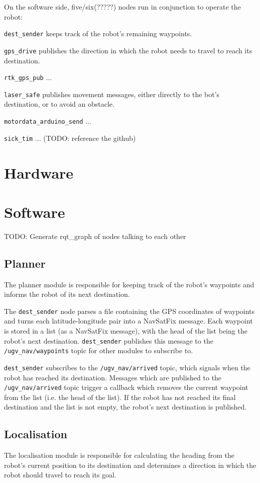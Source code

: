 \documentclass[titlepage,12pt,a4paper]{article}
\begin{document}
On the software side, five/six(?????) nodes run in conjunction to operate the robot:

\verb|dest_sender| keeps track of the robot's remaining waypoints.

\verb|gps_drive| publishes the direction in which the robot needs to travel to reach its destination.

\verb|rtk_gps_pub| ...

\verb|laser_safe| publishes movement messages, either directly to the bot's destination, or to avoid an obstacle.

\verb|motordata_arduino_send| ...

\verb|sick_tim| ... (TODO: reference the github)

\pagebreak
\section{Hardware}

\pagebreak
\section{Software}

TODO: Generate rqt\_graph of nodes talking to each other

\subsection{Planner}
The planner module is responsible for keeping track of the robot's waypoints and informs the robot of its next destination. 

The \verb|dest_sender| node parses a file containing the GPS coordinates of waypoints and turns each latitude-longitude pair into a NavSatFix message. Each waypoint is stored in a list (as a NavSatFix message), with the head of the list being the robot's next destination. \verb|dest_sender| publishes this message to the \verb|/ugv_nav/waypoints| topic for other modules to subscribe to.

\verb|dest_sender| subscribes to the \verb|/ugv_nav/arrived| topic, which signals when the robot has reached its destination. Messages which are published to the \verb|/ugv_nav/arrived| topic trigger a callback which removes the current waypoint from the list (i.e. the head of the list). If the robot has not reached its final destination and the list is not empty, the robot's next destination is published.

\subsection{Localisation}
The localisation module is responsible for calculating the heading from the robot's current position to its destination and determines a direction in which the robot should travel to reach its goal.
\end{document}
